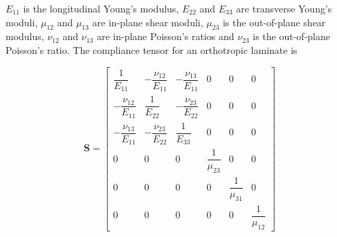 $E_{11}$ is the longitudinal Young's modulus, $E_{22}$ and $E_{33}$ are transverse Young's moduli, $\mu_{12}$ and $\mu_{13}$ are in-plane shear moduli, $\mu_{23}$ is the out-of-plane shear modulus, $\nu_{12}$ and $\nu_{13}$ are in-plane Poisson's ratios and $\nu_{23}$ is the out-of-plane Poisson's ratio. The compliance tensor for an orthotropic laminate is

\begin{equation}
\bm{S}
=\begin{bmatrix}
\dfrac{1}{E_{11}} & -\dfrac{\nu_{12}}{E_{11}} & -\dfrac{\nu_{13}}{E_{11}} & 0 & 0 & 0 \\ 
-\dfrac{\nu_{12}}{E_{11}} & \dfrac{1}{E_{22}} & -\dfrac{\nu_{23}}{E_{22}} & 0 & 0 & 0 \\ 
-\dfrac{\nu_{13}}{E_{11}} & -\dfrac{\nu_{23}}{E_{22}} & \dfrac{1}{E_{33}} & 0 & 0 & 0 \\ 
0 & 0 & 0 & \dfrac{1}{\mu_{23}} & 0 & 0 \\ 
0 & 0 & 0 & 0 & \dfrac{1}{\mu_{31}} & 0 \\ 
0 & 0 & 0& 0 & 0 & \dfrac{1}{\mu_{12}}
\end{bmatrix}
\label{eq:ortho_compliance}
\end{equation}
